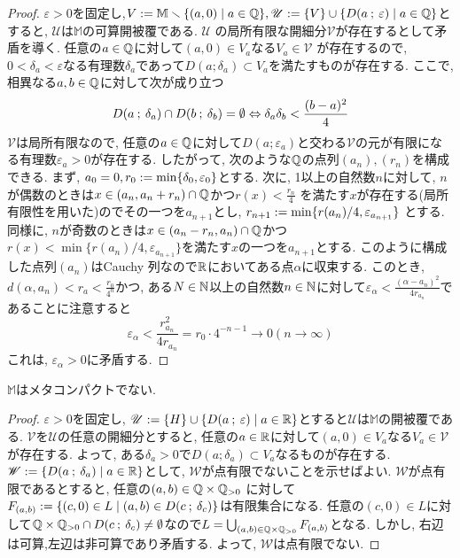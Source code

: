 \documentclass[uplatex, dvipdfmx, a4paper, 12pt, class=jsbook, crop=false]{standalone}
\begin{document}
\begin{proof}
	$ \varepsilon > 0 $を固定し,$ V \defeq \mathbb{M} \setminus \setcomp{(a,0)}{a \in \Q}, \mathscr{U} \defeq \{V\} \cup \setcomp{D(a \semicolon \varepsilon)}{a \in \Q} $とすると, $ \mathscr{U} $は$ \mathbb{M} $の可算開被覆である. $ \mathscr{U}$ 
	の局所有限な開細分$ \mathscr{V} $が存在するとして矛盾を導く. 任意の$ a \in \mathbb{Q} $に対して$ (a, 0) \in V_a $なる$ V_a \in \mathscr{V}$ 
	が存在するので, $ 0 < \delta_a < \varepsilon $なる有理数$ \delta_a $であって$ D(a \semicolon \delta_a) \subset V_a $を満たすものが存在する. ここで, 相異なる$ a, b \in \mathbb{Q} $に対して次が成り立つ
	$$D(a \mathpunct{\: ; \:} \delta_a) \cap D(b \mathpunct{\: ; \:} \delta_b) = \emptyset \Leftrightarrow \delta_a\delta_b < \frac{(b-a)^2}{4}$$
	$ \mathscr{V} $は局所有限なので, 任意の$ a \in \mathbb{Q} $に対して$ D(a \semicolon \varepsilon_a) $と交わる$ \mathscr{V} $の元が有限になる有理数$ \varepsilon_a >0 $が存在する. したがって, 次のような$ \mathbb{Q} $の点列$ (a_n), (r_n) $を構成できる. まず, $ a_0 = 0, r_0 \mathrel{:=} \min\{\delta_0, \varepsilon_0 \} $とする. 次に, 1以上の自然数$ n $に対して, $ n $が偶数のときは$ x \in (a_n, a_n + r_n) \cap \mathbb{Q} $かつ$ r(x) < \frac{r_n}{4} $
	を満たす$ x $が存在する(局所有限性を用いた)のでその一つを$ a_{n+1} $とし, $ r_{n+1} \mathrel{:=} \min\{r(a_n)/4, \varepsilon_{a_{n+1}}\}$ とする. 同様に, $ n $が奇数のときは$ x \in (a_n - r_n, a_n) \cap \mathbb{Q} $かつ$ r(x) < \min\{r(a_n)/4, \varepsilon_{a_{n+1}}\} $を満たす$ x $の一つを$ a_{n+1} $とする. このように構成した点列$ (a_n) $はCauchy 列なので$ \mathbb{R} $においてある点$ \alpha $に収束する. このとき, $ d(\alpha, a_n) < r_a <\frac{r_0}{4^n} $かつ, ある$ N \in \mathbb{N} $以上の自然数$ n \in \mathbb{N} $に対して$ \varepsilon_\alpha < \frac{(\alpha - a_n)^2}{4r_{a_n}} $であることに注意すると
	$$\varepsilon_\alpha < \frac{r_{a_n}^2}{4r_{a_n}}=r_0\cdot 4^{-n-1} \to 0 (n \to \infty)$$ 
	これは, $ \varepsilon_\alpha > 0 $に矛盾する.
\end{proof}

\begin{property}
	$ \mathbb{M} $はメタコンパクトでない.
\end{property}

\begin{proof}
	$ \varepsilon >0 $を固定し, $ \mathscr{U} \defeq \{H\} \cup \setcomp{D(a \semicolon \varepsilon)}{a \in \R} $とすると$ \mathscr{U} $は$ \mathbb{M} $の開被覆である. $ \mathscr{V} $を$ \mathscr{U} $の任意の開細分とすると, 任意の$ a \in \mathbb{R} $に対して$ (a, 0) \in V_a $なる$ V_a \in \mathscr{V} $が存在する. よって, ある$ \delta_a > 0 $で$ D(a \semicolon \delta_a) \subset V_a $なるものが存在する. $ \mathscr{W} \defeq \setcomp{D(a \semicolon \delta_a)}{a \in \R} $として, $ \mathscr{W} $が点有限でないことを示せばよい. $ \mathscr{W} $が点有限であるとすると, 任意の$ (a, b) \in \mathbb{Q} \times \mathbb{Q}_{>0}$ 
	に対して$ F_{(a, b)} \defeq \setcomp{(c, 0) \in L}{(a, b) \in D(c \semicolon \delta_c)} $は有限集合になる.
	 任意の$ (c, 0) \in L $に対して$ \mathbb{Q} \times \mathbb{Q}_{>0} \cap 
	 D(c \mathpunct{\: ; \:} \delta_c) \neq \emptyset $なので$ L = \bigcup_{(a, b) \in \mathbb{Q} \times \mathbb{Q}_{>0}} F_{(a, b)} $となる.
	 しかし, 右辺は可算,左辺は非可算であり矛盾する. よって, $ \mathscr{W} $は点有限でない.
\end{proof}
\end{document}
